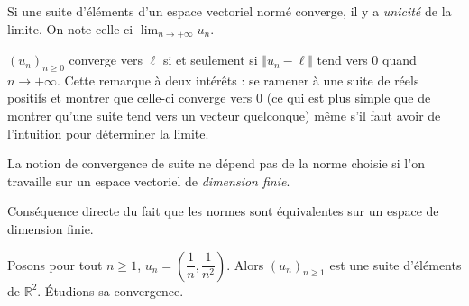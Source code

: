 \documentclass[french,11pt,twoside]{VcCours}
\begin{document}
\begin{Theoreme}{} Si une suite d'éléments d'un espace vectoriel normé converge, il y a \emph{unicité} de la limite. On note celle-ci $\lim_{n \rightarrow + \infty} u_n$.
\end{Theoreme}

\begin{Remarque}{} $(u_n)_{n \geq 0}$ converge vers $\ell$ si et seulement si $\Vert u_n - \ell \Vert$ tend vers $0$ quand $n \rightarrow + \infty$.  Cette remarque à deux intérêts : se ramener à une suite de réels positifs et montrer que celle-ci converge vers $0$ (ce qui est plus simple que de montrer qu'une suite tend vers un vecteur quelconque) même s'il faut avoir de l'intuition pour déterminer la limite.
\end{Remarque}

\begin{Theoreme}{} La notion de convergence de suite ne dépend pas de la norme choisie si l'on travaille sur un espace vectoriel de \emph{dimension finie}.
\end{Theoreme}

\begin{Demonstration}{} Conséquence directe du fait que les normes sont équivalentes sur un espace de dimension finie.
\end{Demonstration}

\begin{Exemple} Posons pour tout $n \geq 1$, $u_n = \left( \dfrac{1}{n}, \dfrac{1}{n^2} \right)$. Alors $(u_n)_{n \geq 1}$ est une suite d'éléments de $\mathbb{R}^2$. Étudions sa convergence.

%
%
%

\vspace*{6cm}
\end{Exemple}
\end{document}
